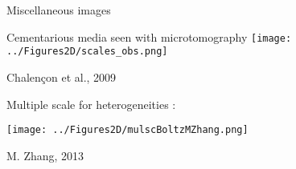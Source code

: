 
\begin{frame}{Miscellaneous images}%
%
\begin{multicols}{2}
Cementarious media seen with microtomography
%
\texttt{[image: ../Figures2D/scales\_obs.png]}

\par
Chalen\c con et al., 2009

\columnbreak
Multiple scale for heterogeneities : 

\texttt{[image: ../Figures2D/mulscBoltzMZhang.png]}

\par
M. Zhang, 2013
\end{multicols}
%
%
\end{frame}

